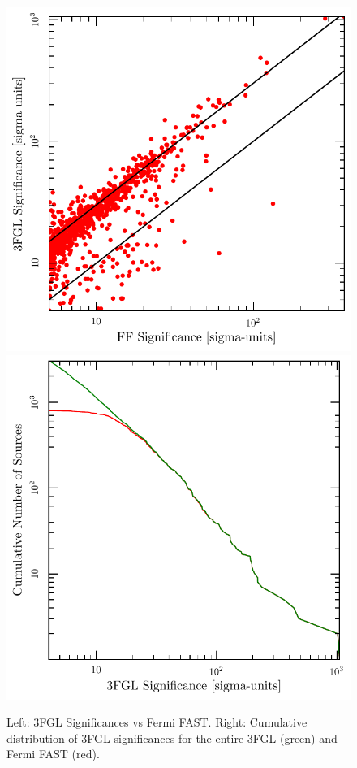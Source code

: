 \documentclass[useAMS,usenatbib]{mn2e}
\begin{document}
\begin{figure}
\includegraphics[width=\columnwidth]{sign-comp}
\includegraphics[width=\columnwidth]{sign-dist}
\caption{Left: 3FGL Significances vs Fermi FAST.  Right: Cumulative distribution of 3FGL significances for the entire 3FGL (green)
  and Fermi FAST (red).}
\end{figure}
\end{document}
